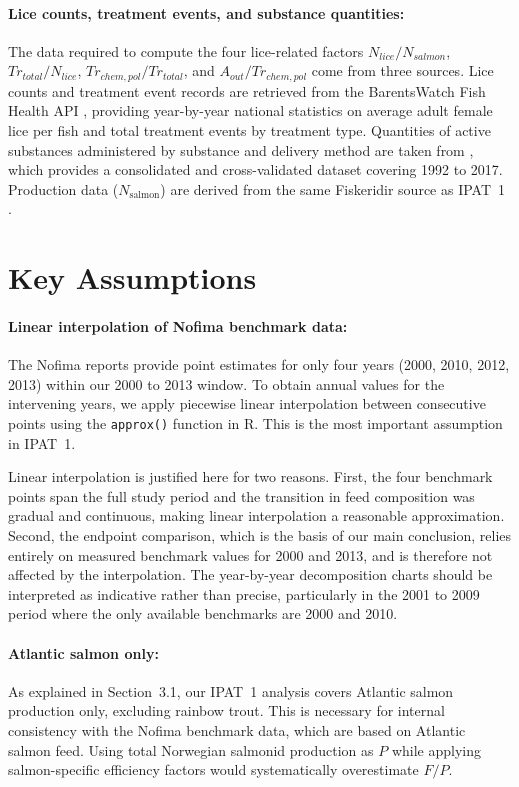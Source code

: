\documentclass[12pt, a4paper]{report}
\begin{document}
\paragraph{Lice counts, treatment events, and substance quantities:}
The data required to compute the four lice-related factors 
$N_{lice}/N_{salmon}$, $Tr_{total}/N_{lice}$,
$Tr_{chem,pol}/Tr_{total}$, and $A_{out}/Tr_{chem,pol}$ come from 
three sources. Lice counts and treatment event records are retrieved 
from the BarentsWatch Fish Health API \citep{barentswatch}, providing 
year-by-year national statistics on average adult female lice per fish 
and total treatment events by treatment type. Quantities of active 
substances administered by substance and delivery method are taken 
from \citet{myhrjensen2020}, which provides a consolidated and 
cross-validated dataset covering 1992 to 2017. Production data 
($N_{\text{salmon}}$) are derived from the same Fiskeridir source 
as IPAT~1 \citep{fiskeridir2024}.

\section{Key Assumptions}

\paragraph{Linear interpolation of Nofima benchmark data:}
The Nofima reports provide point estimates for only four years (2000,
2010, 2012, 2013) within our 2000 to 2013 window. To obtain annual
values for the intervening years, we apply piecewise linear interpolation
between consecutive points using the \texttt{approx()} function
in R. This is the most important assumption in IPAT~1.

Linear interpolation is justified here for two reasons. First, the
four benchmark points span the full study period and the transition
in feed composition was gradual and continuous, making linear
interpolation a reasonable approximation. Second, the endpoint
comparison, which is the basis of our main conclusion, relies
entirely on measured benchmark values for 2000 and 2013, and is
therefore not affected by the interpolation. The year-by-year
decomposition charts should be interpreted as indicative
rather than precise, particularly in the 2001 to 2009 period where
the only available benchmarks are 2000 and 2010.

\paragraph{Atlantic salmon only:}
As explained in Section~3.1, our IPAT~1 analysis covers Atlantic salmon
production only, excluding rainbow trout. This is necessary for internal
consistency with the Nofima benchmark data, which are based on Atlantic
salmon feed. Using total Norwegian salmonid production as $P$ while
applying salmon-specific efficiency factors would systematically
overestimate $F/P$.
\end{document}
